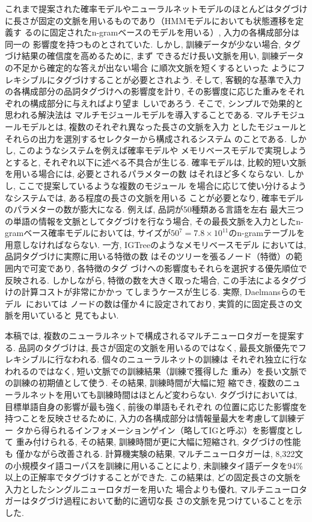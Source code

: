 これまで提案された確率モデルやニューラルネットモデルのほとんどはタグづけ
に長さが固定の文脈を用いるものであり（HMMモデルにおいても状態遷移を定義す
るのに固定されたn-gramベースのモデルを用いる）, 入力の各構成部分は同一の
影響度を持つものとされていた. 
しかし, 訓練データが少ない場合, タグづけ結果の確信度を高めるために, まず
できるだけ長い文脈を用い, 訓練データの不足から確定的な答えが出ない場合
に順次文脈を短くするといった
ようにフレキシブルにタグづけすることが必要とされよう. そして, 
客観的な基準で入力の各構成部分の品詞タグづけへの影響度を計り, 
その影響度に応じた重みをそれぞれの構成部分に与えればより望ま
しいであろう.
そこで, シンプルで効果的と思われる解決法は
マルチモジュールモデルを導入することである.
マルチモジュールモデルとは, 複数のそれぞれ異なった長さの文脈を入力
としたモジュールとそれらの出力を選別するセレクターから構成されるシステム
のことである. しかし, このようなシステムを例えば確率モデルや
メモリベースモデルで実現しようとすると, それぞれ以下に述べる不具合が生じる.
確率モデルは, 比較的短い文脈を用いる場合には, 必要とされるパラメターの数
はそれほど多くならない. しかし, ここで提案しているような複数のモジュール
を場合に応じて使い分けるようなシステムでは, ある程度の長さの文脈を用いる
ことが必要となり, 確率モデルのパラメターの数が膨大になる.
例えば, 品詞が50種類ある言語を左右
最大三つの単語の情報を文脈としてタグづけを行なう場合,
その最長文脈を入力としたn-gramベース確率モデルにおいては,
サイズが$50^7=7.8 \times 10^{11}$のn-gramテーブルを用意しなければならない. 
一方, IGTreeのようなメモリベースモデル
\cite{daelemans:96}においては, 品詞タグづけに実際に用いる特徴の数
はそのツリーを張るノード（特徴）の範囲内で可変であり, 各特徴のタグ
づけへの影響度もそれらを選択する優先順位で反映される. しかしながら, 
特徴の数を大きく取った場合, この手法によるタグづけの計算コストが非常にかかっ
てしまうケースが生じる. 実際, Daelmansらのモデル~\cite{daelemans:96}においては
ノードの数は僅か４に設定されており, 実質的に固定長さの文脈を用いていると
見てもよい.

本稿では, 複数のニューラルネットで構成されるマルチニューロタガーを提案す
る. 品詞のタグづけは, 長さが固定の文脈を用いるのではなく, 
最長文脈優先でフレキシブルに行なわれる. 個々のニューラルネットの訓練は
それぞれ独立に行なわれるのではなく, 短い文脈での訓練結果（訓練で獲得した
重み）を長い文脈での訓練の初期値として使う. その結果, 訓練時間が大幅に短
縮でき, 複数のニューラルネットを用いても訓練時間はほとんど変わらない.
タグづけにおいては, 目標単語自身の影響が最も強く, 前後の単語もそれぞれ
の位置に応じた影響度を持つことを反映させるために,
入力の各構成部分は情報量最大を考慮して訓練デー
タから得られるインフォメーションゲイン（略してIGと呼ぶ）を影響度として
重み付けられる, その結果, 訓練時間が更に大幅に短縮され, タグづけの性能も
僅かながら改善される. 計算機実験の結果, マルチニューロタガーは,
8,322文の小規模タイ語コーパスを訓練に用いることにより, 
未訓練タイ語データを94\%以上の正解率でタグづけすることができた.
この結果は, どの固定長さの文脈を入力としたシングルニューロタガーを用いた
場合よりも優れ, マルチニューロタガーはタグづけ過程において動的に適切な長
さの文脈を見つけていることを示した. 

